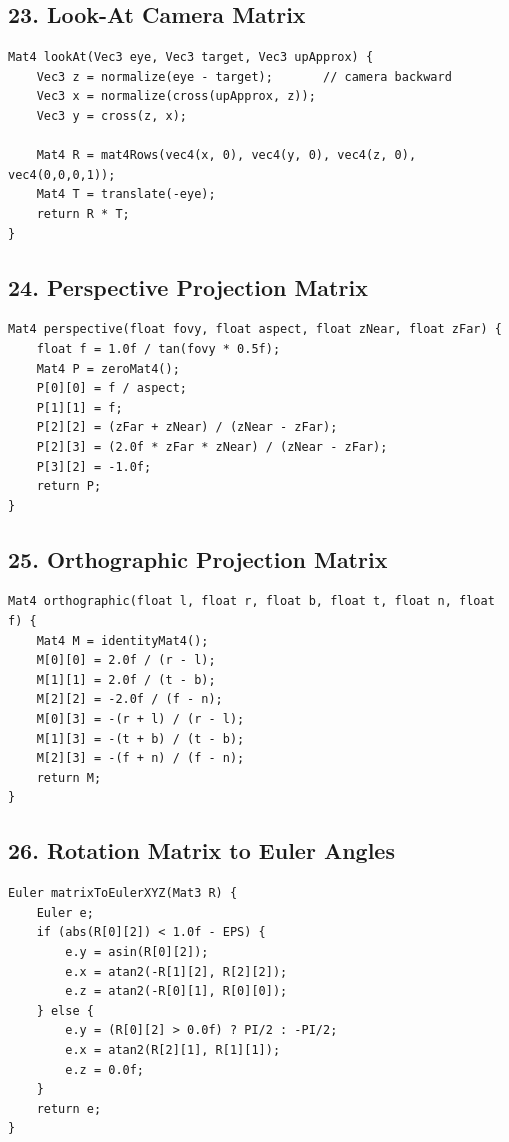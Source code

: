 \documentclass[10pt,letterpaper]{article}
\begin{document}
\subsection{23. Look-At Camera Matrix}

\begin{verbatim}
Mat4 lookAt(Vec3 eye, Vec3 target, Vec3 upApprox) {
    Vec3 z = normalize(eye - target);       // camera backward
    Vec3 x = normalize(cross(upApprox, z));
    Vec3 y = cross(z, x);

    Mat4 R = mat4Rows(vec4(x, 0), vec4(y, 0), vec4(z, 0), vec4(0,0,0,1));
    Mat4 T = translate(-eye);
    return R * T;
}
\end{verbatim}

\subsection{24. Perspective Projection Matrix}

\begin{verbatim}
Mat4 perspective(float fovy, float aspect, float zNear, float zFar) {
    float f = 1.0f / tan(fovy * 0.5f);
    Mat4 P = zeroMat4();
    P[0][0] = f / aspect;
    P[1][1] = f;
    P[2][2] = (zFar + zNear) / (zNear - zFar);
    P[2][3] = (2.0f * zFar * zNear) / (zNear - zFar);
    P[3][2] = -1.0f;
    return P;
}
\end{verbatim}

\subsection{25. Orthographic Projection Matrix}

\begin{verbatim}
Mat4 orthographic(float l, float r, float b, float t, float n, float f) {
    Mat4 M = identityMat4();
    M[0][0] = 2.0f / (r - l);
    M[1][1] = 2.0f / (t - b);
    M[2][2] = -2.0f / (f - n);
    M[0][3] = -(r + l) / (r - l);
    M[1][3] = -(t + b) / (t - b);
    M[2][3] = -(f + n) / (f - n);
    return M;
}
\end{verbatim}

\subsection{26. Rotation Matrix to Euler Angles}

\begin{verbatim}
Euler matrixToEulerXYZ(Mat3 R) {
    Euler e;
    if (abs(R[0][2]) < 1.0f - EPS) {
        e.y = asin(R[0][2]);
        e.x = atan2(-R[1][2], R[2][2]);
        e.z = atan2(-R[0][1], R[0][0]);
    } else {
        e.y = (R[0][2] > 0.0f) ? PI/2 : -PI/2;
        e.x = atan2(R[2][1], R[1][1]);
        e.z = 0.0f;
    }
    return e;
}
\end{verbatim}
\end{document}
